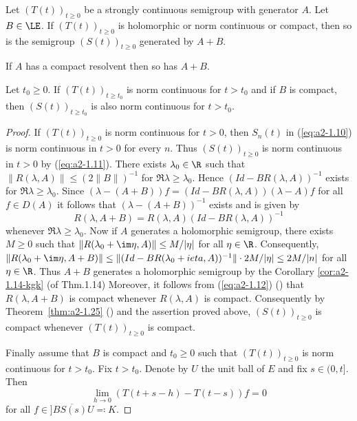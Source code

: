 \begin{theorem} \label{thm:a2-1.30}
Let $(T(t))_{t \geq 0}$ be a strongly continuous semigroup with generator $A$.
Let $B \in \LE$.
If $(T(t))_{t \geq 0}$ is holomorphic or norm continuous or compact, then so is the semigroup 
$(S(t))_{t \geq 0}$ 
generated by $A+B$.

If $A$ has a compact resolvent then so has $A+B$.

Let $t_{0} \geq 0$.
If $(T(t))_{t \geq t_{0}}$ is norm continuous for $t > t_{0}$ and if 
$B$ is compact, then $(S(t))_{t \geq t_{0}}$ is also norm continuous for $t > t_{0}$.

\begin{proof}
If $(T(t))_{t \geq 0}$ is norm continuous for $t > 0$, then $S_{n}(t)$ in (\eqref{eq:a2-1.10}) is norm continuous in $t > 0$ for every $n$.
Thus $(S(t))_{t \geq 0}$ is norm continuous in $t > 0$ by (\eqref{eq:a2-1.11}).
There exists $\lambda_{0} \in \R$ such that 
$\|R(\lambda,A)\| \leq (2\|B\|)^{-1}$ for $\Re\lambda \geq \lambda_{0}$.
Hence $(Id - BR(\lambda,A))^{-1}$ exists for $\Re\lambda \geq \lambda_{0}$.
Since $(\lambda-(A+B))f = (Id-BR(\lambda,A))(\lambda-A)f$ for all $f \in D(A)$ it follows that $(\lambda-(A+B))^{-1}$ exists and is given by
\begin{equation}\label{eq:a2-1.12}
    R(\lambda,A+B) = R(\lambda,A)(Id-BR(\lambda,A))^{-1}
\end{equation}
whenever $\Re\lambda \geq \lambda_{0}$.
Now if $A$ generates a holomorphic semigroup,
there exists $M \geq 0$ such that $\|R(\lambda_{0}+\im\eta,A)\| \leq M/|\eta|$ for all $\eta \in \R$.
Consequently, $\|R(\lambda_{0}+\im\eta,A+B)\| \leq \|(Id-BR(\lambda_{0}+ieta,A))^{-1}\| \cdot 2M/|\eta| \leq 2M/|n|$ for all $\eta \in \R$.
Thus $A + B$ generates a holomorphic semigroup by the Corollary \ref{cor:a2-1.14-kgk} (\lnm of Thm.1.14)
Moreover, it follows from (\eqref{eq:a2-1.12}) (\lnm ) that $R(\lambda,A+B)$ is compact whenever $R(\lambda,A)$  is compact.
Consequently by Theorem~\ref{thm:a2-1.25} () and the assertion proved above, $(S(t))_{t \geq 0}$ is compact whenever $(T(t))_{t \geq 0}$ is compact.

Finally assume that $B$ is compact and $t_{0} \geq 0$ such that $(T(t))_{t \geq 0}$ 
is norm continuous for $t > t_{0}$.
Fix $t > t_{0}$.
Denote by $U$ the unit ball of $E$ and fix $s \in (0,t]$.
Then
\[
    \lim_{h \to 0} (T(t+s-h) - T(t-s))f = 0
\]
for all $f \in \overline{]BS(s)U} \eqqcolon K$.


\end{proof}
\end{theorem}
